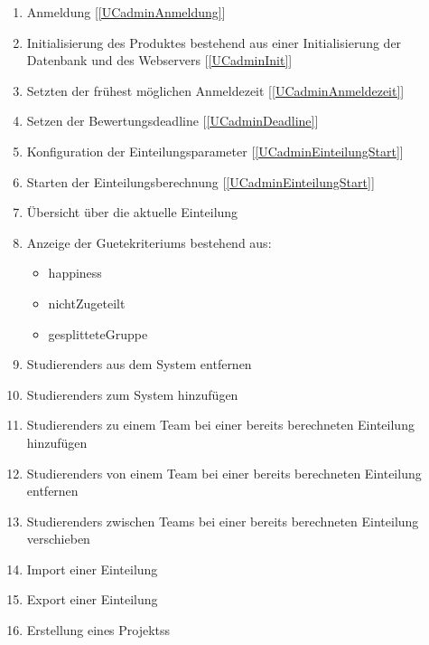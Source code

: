 \documentclass[parskip=full]{scrartcl}
\newcommand{\swtLabel}[1]{\textbf{/#1\arabic*0/}}
\newcommand{\testRef}[1]{[\ref{#1}]}
\begin{document}
\begin{enumerate}[label=\swtLabel{FA}, resume]
  \item Anmeldung \label{FAadminAnmeldung} \testRef{UCadminAnmeldung}
  \item Initialisierung des Produktes bestehend aus einer Initialisierung der
  Datenbank und des Webservers
  \label{FAadminInit} \testRef{UCadminInit}
  \item Setzten der frühest möglichen Anmeldezeit \label{FAadminAnmeldezeit}
  \testRef{UCadminAnmeldezeit}
  \item Setzen der Bewertungsdeadline \label{FAadminDeadline} \testRef{UCadminDeadline}
  \item Konfiguration der Einteilungsparameter \label{FAadminParameter}
  \testRef{UCadminEinteilungStart}
  \item Starten der Einteilungsberechnung \label{FAadminEinteilungstart}
  \testRef{UCadminEinteilungStart}
  \item Übersicht über die aktuelle Einteilung \label{FAadminÜbersicht}
  \item Anzeige der \glspl{Guetekriterium} bestehend aus:
    \begin{itemize}
      \item \gls{happiness}
      \item \gls{nichtZugeteilt}
      \item \gls{gesplitteteGruppe}
    \end{itemize} \label{FAadminGüte}
  \item \glspl{Studierender} aus dem System entfernen \label{FAadminDeleteStudFromSystem}
  \item \glspl{Studierender} zum System hinzufügen \label{FAadminAddStudToSystem}
  \item \glspl{Studierender} zu einem \gls{Team} bei einer bereits berechneten
  Einteilung hinzufügen \label{FAadminAddStudToTeam}
  \item \glspl{Studierender} von einem \gls{Team} bei einer bereits berechneten
  Einteilung entfernen \label{FAadminRemoveStudFromTeam}
  \item \glspl{Studierender} zwischen \glspl{Team} bei einer bereits berechneten
  Einteilung verschieben  \label{FAadminMoveStudsBetweenTeams}
  \item Import einer Einteilung \label{FAimport}
  \item Export einer Einteilung \label{FAexport}
  \item Erstellung eines \glspl{Projekt}s \label{FAadminCreateProjekt}

\end{enumerate}
\end{document}
